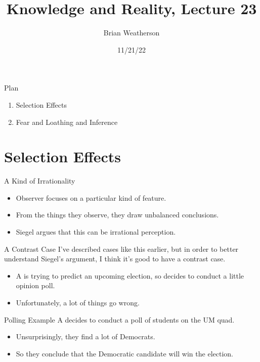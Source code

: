 \documentclass[
  17pt,
  letterpaper,
  ignorenonframetext,
  aspectratio=169,
  handout,
  xcolor={dvipsnames}]{beamer}
\title{Knowledge and Reality, Lecture 23}
\author{Brian Weatherson}
\date{11/21/22}
\providecommand{\tightlist}{%
  \setlength{\itemsep}{0pt}\setlength{\parskip}{0pt}}\usepackage{longtable,booktabs,array}
\begin{document}
\frame{\titlepage}
\ifdefined\Shaded\renewenvironment{Shaded}{\begin{tcolorbox}[enhanced, boxrule=0pt, sharp corners, breakable, frame hidden, borderline west={3pt}{0pt}{shadecolor}, interior hidden]}{\end{tcolorbox}}\fi

\begin{frame}{Plan}
\protect\hypertarget{plan}{}
\begin{enumerate}[<+->]
\tightlist
\item
  Selection Effects
\item
  Fear and Loathing and Inference
\end{enumerate}
\end{frame}

\hypertarget{selection-effects}{%
\section{Selection Effects}\label{selection-effects}}

\begin{frame}{A Kind of Irrationality}
\protect\hypertarget{a-kind-of-irrationality}{}
\begin{itemize}[<+->]
\tightlist
\item
  Observer focuses on a particular kind of feature.
\item
  From the things they observe, they draw unbalanced conclusions.
\item
  Siegel argues that this can be irrational perception.
\end{itemize}
\end{frame}

\begin{frame}{A Contrast Case}
\protect\hypertarget{a-contrast-case}{}
I've described cases like this earlier, but in order to better
understand Siegel's argument, I think it's good to have a contrast case.

\begin{itemize}[<+->]
\tightlist
\item
  A is trying to predict an upcoming election, so decides to conduct a
  little opinion poll.
\item
  Unfortunately, a lot of things go wrong.
\end{itemize}
\end{frame}

\begin{frame}{Polling Example}
\protect\hypertarget{polling-example}{}
A decides to conduct a poll of students on the UM quad.

\begin{itemize}[<+->]
\tightlist
\item
  Unsurprisingly, they find a lot of Democrats.
\item
  So they conclude that the Democratic candidate will win the election.
\end{itemize}
\end{frame}
\end{document}
